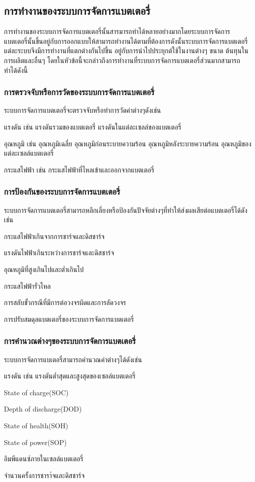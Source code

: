 \subsection{การทำงานของระบบการจัดการแบตเตอรี่}
การทำงานของระบบการจัดการแบตเตอรี่นั้นสารมารถทำได้หลายอย่างมากโดยระบบการจัดการแบตเตอรี่นั้นขึ้นอยู่กับการออกแบบให้สามารถทำงานได้ตามที่ต้องการดังนั้นระบบการจัดการแบตเตอรี่แต่ละระบบจึงมีการทำงานที่แตกต่างกันไปขึ้น
อยู่กับการนำไปประยุกต์ใช้ในงานต่างๆ ขนาด ต้นทุนในการผลิตและอื่นๆ โดยในหัวข้อนี้จะกล่าวถึงการทำงานที่ระบบการจัดการแบตเตอรี่ส่วนมากสามารถทำได้ดังนี้
\subsubsection*{การตรวจจับหรือการวัดของระบบการจัดการแบตเตอรี่}
ระบบการจัดการแบตเตอรี่จะตรวจจับหรือทำการวัดค่าต่างๆดังเช่น
\begin{itemize}
	{\item 	แรงดัน เช่น แรงดันรวมของแบตเตอรี่ แรงดันในแต่ละเซลล์ของแบตเตอรี่}
	{\item 	อุณหภูมิ เช่น อุณหภูมิเฉลี่ย อุณหภูมิก่อนระบายความร้อน อุณหภูมิหลังระบายความร้อน อุณหภูมิของแต่ละเซลล์แบตเตอรี่}
	{\item 	กระแสไฟฟ้า เช่น กระแสไฟฟ้าที่ไหลเข้าและออกจากแบตเตอรี่}
\end{itemize}
\subsubsection*{การป้องกันของระบบการจัดการแบตเตอรี่}
ระบบการจัดการแบตเตอรี่สามารถหลีกเลี่ยงหรือป้องกันปัจจัยต่างๆที่ทำให้ส่งผลเสียต่อแบตเตอรี่ได้ดังเช่น
\begin{itemize}
	{\item 	กระแสไฟฟ้าเกินจากการชาร์จและดิสชาร์จ}
	{\item 	แรงดันไฟฟ้าเกินระหว่างการชาร์จและดิสชาร์จ}
	{\item 	อุณหภูมิที่สูงเกินไปและต่ำเกินไป}
	{\item 	กระแสไฟฟ้ารั่วไหล}
	{\item 	การสลับขั้วกรณีที่มีการต่อวงจรผิดและการลัดวงจร}
	{\item 	การปรับสมดุลแบตเตอรี่ของระบบการจัดการแบตเตอรี่}
\end{itemize}
\subsubsection*{การคำนวณต่างๆของระบบการจัดการแบตเตอรี่}
ระบบการจัดการแบเตอรี่สามารถคำนวณค่าต่างๆได้ดังเช่น
\begin{itemize}
	{\item 	แรงดัน เช่น แรงดันต่ำสุดและสูงสุดของเซลล์แบตเตอรี่}
	{\item 	State of charge(SOC)}
	{\item 	Depth of discharge(DOD)}
	{\item 	State of health(SOH)}
	{\item 	State of power(SOP)}
	{\item 	อิมพีแดนซ์ภายในเซลล์แบตเตอรี่}
	{\item 	จำนวนครั้งการชารา์จและดิสชาร์จ}
\end{itemize}
